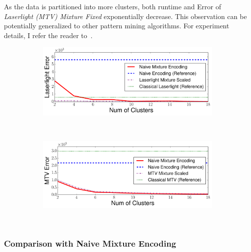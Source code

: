 As the data is partitioned into more clusters, both runtime and Error of \emph{Laserlight (MTV) Mixture Fixed} exponentially decrease.
This observation can be potentially generalized to other pattern mining algorithms.
For experiment details, I refer the reader to~\cite{DBLP:journals/corr/abs-1809-00405}.

\begin{figure}[h!]
	\captionsetup[subfigure]{justification=centering}
    \centering
    \begin{subfigure}[b]{0.47\textwidth}
        \centering       
        \includegraphics[width=\textwidth]{QueryLogSummarization/graphics/Laserlight_Errors_vs_NumOfClusters.pdf}
       \label{fig:LaserlightMixture_Errors_vs_NumOfClusters}
\end{subfigure}
    ~
\begin{subfigure}[b]{0.47\textwidth}
  \centering       
  \includegraphics[width=\textwidth]{QueryLogSummarization/graphics/MTV_Error_vs_NumOfClusters.pdf}
 \label{fig:MTVMixture_vs_Laserlight_runningTimes_IncomeData}
\end{subfigure}
~
\label{fig:Naive Mixture Encoding_vs_Laserlight&MTV_Mixture}
\trimfigurewhitespace
\end{figure}
\subsubsection{Comparison with Naive Mixture Encoding}
\label{sec:Evaluating_Naive_Mixture_Encoding}

